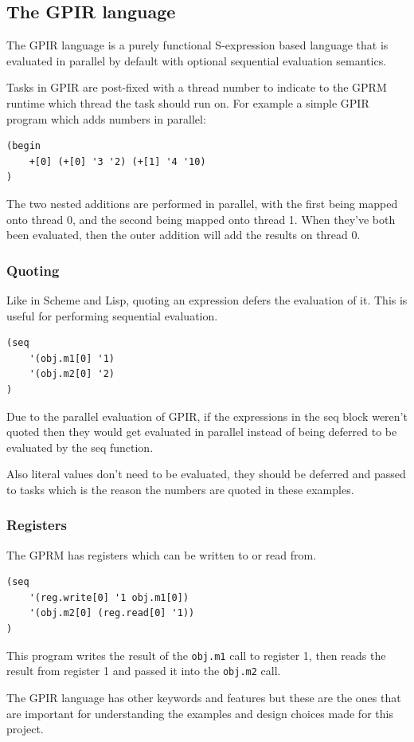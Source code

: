 \subsection{The GPIR language}

The GPIR language is a purely functional S-expression based language that is evaluated in parallel by default 
with optional sequential evaluation semantics.

Tasks in GPIR are post-fixed with a thread number to indicate to the GPRM runtime which thread
the task should run on. For example a simple GPIR program which adds numbers in parallel:

\begin{lstlisting}[style=myGPIR]
(begin
    +[0] (+[0] '3 '2) (+[1] '4 '10)
)
\end{lstlisting}

The two nested additions are performed in parallel, with the first being mapped onto thread 0,
and the second being mapped onto thread 1. When they've both been evaluated, then the outer addition
will add the results on thread 0.

\subsubsection{Quoting}

Like in Scheme and Lisp, quoting an expression defers the evaluation of it. 
This is useful for performing sequential evaluation.

\begin{lstlisting}[style=myGPIR]
(seq 
    '(obj.m1[0] '1)
    '(obj.m2[0] '2)
)
\end{lstlisting}

Due to the parallel evaluation of GPIR, if the expressions in the seq block weren't quoted then
they would get evaluated in parallel instead of being deferred to be evaluated by the seq function.

Also literal values don't need to be evaluated, they should be deferred and passed to tasks which is
the reason the numbers are quoted in these examples.

\subsubsection{Registers}

The GPRM has registers which can be written to or read from.

\begin{lstlisting}[style=myGPIR]
(seq
    '(reg.write[0] '1 obj.m1[0])
    '(obj.m2[0] (reg.read[0] '1))
)
\end{lstlisting}

This program writes the result of the \texttt{obj.m1} call to register 1,
then reads the result from register 1 and passed it into the \texttt{obj.m2} call.

The GPIR language has other keywords and features but these are the ones that are important for
understanding the examples and design choices made for this project.
